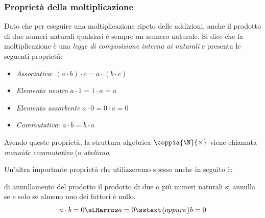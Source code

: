 \subsubsection{Proprietà della moltiplicazione}

Dato che per eseguire una moltiplicazione ripeto delle addizioni, 
anche il prodotto di due numeri  naturali qualsiasi è sempre un numero 
naturale. 
Si dice che la moltiplicazione è una \emph{legge di composizione interna ai
naturali} e presenta le seguenti proprietà:

\begin{itemize} [noitemsep]
 \item \emph{Associativa}: \((a \cdot b) \cdot c = a \cdot (b \cdot c)\)
 \item \emph{Elemento neutro} \(a \cdot 1 = 1 \cdot a = a\)
 \item \emph{Elemento assorbente} \(a \cdot 0 = 0 \cdot a = 0\)
 \item \emph{Commutativa}: \(a \cdot b = b \cdot a\)
\end{itemize}

Avendo queste proprietà, la struttura algebrica \(\coppia{\N}{\times}\) 
viene chiamata \emph{monoide commutativo} (o \emph{abeliano}.


\bigskip %
Un'altra importante proprietà che utilizzeremo spesso anche in seguito è:

\begin{principio}{di annullamento del prodotto}{}
il prodotto di due o più numeri naturali si annulla se e solo se almeno uno 
dei fattori è nullo.
\[ a \cdot b = 0 \sLRarrow a=0 \sstext{oppure} b = 0\]
\end{principio}


